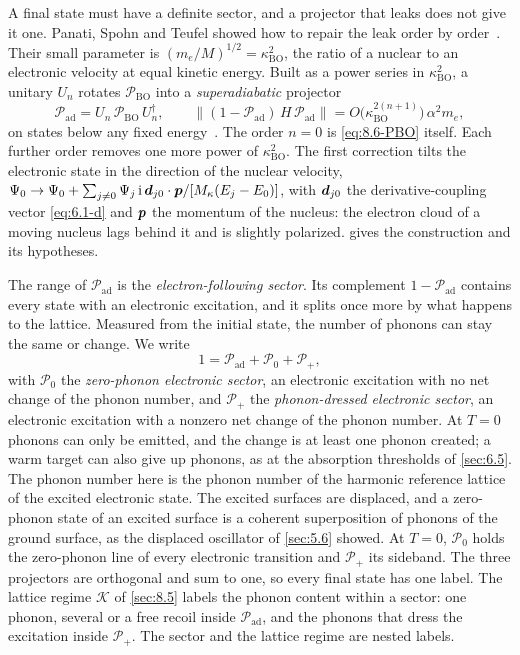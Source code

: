 A final state must have a definite sector, and a projector that leaks does not give it one. Panati, Spohn and Teufel showed how to repair the leak order by order~\cite[Thm.~2.1]{panati2003space}. Their small parameter is $(m_e/M)^{1/2} = \kappa_{\mathrm{BO}}^2$, the ratio of a nuclear to an electronic velocity at equal kinetic energy. Built as a power series in $\kappa_{\mathrm{BO}}^2$, a unitary $U_n$ rotates $\mathcal{P}_{\mathrm{BO}}$ into a \emph{superadiabatic} projector
\begin{equation}
  \mathcal{P}_{\mathrm{ad}} = U_n\,\mathcal{P}_{\mathrm{BO}}\,U_n^\dagger , \qquad
  \bigl\|(1 - \mathcal{P}_{\mathrm{ad}})\,H\,\mathcal{P}_{\mathrm{ad}}\bigr\| = O\bigl(\kappa_{\mathrm{BO}}^{2(n+1)}\bigr)\,\alpha^2m_e ,
  \label{eq:8.6-leak}
\end{equation}
on states below any fixed energy~\cite[Sect.~4.5]{panati2003space}. The order $n = 0$ is \cref{eq:8.6-PBO} itself. Each further order removes one more power of $\kappa_{\mathrm{BO}}^2$. The first correction tilts the electronic state in the direction of the nuclear velocity, $\Psi_0 \to \Psi_0 + \sum_{j\neq0}\Psi_j\,\mathrm{i}\,\bm{d}_{j0}\cdot\bm{p}/[M_\kappa(E_j - E_0)]$, with $\bm{d}_{j0}$ the derivative-coupling vector \cref{eq:6.1-d} and $\bm{p}$ the momentum of the nucleus: the electron cloud of a moving nucleus lags behind it and is slightly polarized.  gives the construction and its hypotheses.

The range of $\mathcal{P}_{\mathrm{ad}}$ is the \emph{electron-following sector}. Its complement $1 - \mathcal{P}_{\mathrm{ad}}$ contains every state with an electronic excitation, and it splits once more by what happens to the lattice. Measured from the initial state, the number of phonons can stay the same or change. We write
\begin{equation}
  1 = \mathcal{P}_{\mathrm{ad}} + \mathcal{P}_0 + \mathcal{P}_+ ,
  \label{eq:8.6-partition}
\end{equation}
with $\mathcal{P}_0$ the \emph{zero-phonon electronic sector}, an electronic excitation with no net change of the phonon number, and $\mathcal{P}_+$ the \emph{phonon-dressed electronic sector}, an electronic excitation with a nonzero net change of the phonon number. At $T = 0$ phonons can only be emitted, and the change is at least one phonon created; a warm target can also give up phonons, as at the absorption thresholds of \cref{sec:6.5}. The phonon number here is the phonon number of the harmonic reference lattice of the excited electronic state. The excited surfaces are displaced, and a zero-phonon state of an excited surface is a coherent superposition of phonons of the ground surface, as the displaced oscillator of \cref{sec:5.6} showed. At $T = 0$, $\mathcal{P}_0$ holds the zero-phonon line of every electronic transition and $\mathcal{P}_+$ its sideband. The three projectors are orthogonal and sum to one, so every final state has one label. The lattice regime $\mathcal{K}$ of \cref{sec:8.5} labels the phonon content within a sector: one phonon, several or a free recoil inside $\mathcal{P}_{\mathrm{ad}}$, and the phonons that dress the excitation inside $\mathcal{P}_+$. The sector and the lattice regime are nested labels.

